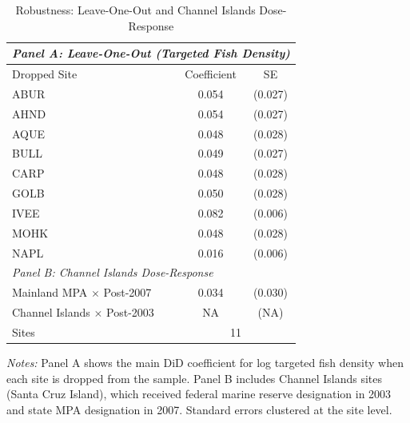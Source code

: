 \begin{table}[t]
\centering
\caption{Robustness: Leave-One-Out and Channel Islands Dose-Response}
\label{tab:robust}
\begin{threeparttable}
\begin{tabular}{lcc}
\toprule
\multicolumn{3}{l}{\textit{Panel A: Leave-One-Out (Targeted Fish Density)}} \\
\midrule
Dropped Site & Coefficient & SE \\
ABUR & 0.054 & (0.027) \\
AHND & 0.054 & (0.027) \\
AQUE & 0.048 & (0.028) \\
BULL & 0.049 & (0.027) \\
CARP & 0.048 & (0.028) \\
GOLB & 0.050 & (0.028) \\
IVEE & 0.082 & (0.006) \\
MOHK & 0.048 & (0.028) \\
NAPL & 0.016 & (0.006) \\
\midrule
\multicolumn{3}{l}{\textit{Panel B: Channel Islands Dose-Response}} \\
\midrule
Mainland MPA $\times$ Post-2007 & 0.034 & (0.030) \\
Channel Islands $\times$ Post-2003 & NA & (NA) \\
Sites & \multicolumn{2}{c}{11} \\
\bottomrule
\end{tabular}
\begin{tablenotes}[flushleft]
\footnotesize
\item \textit{Notes:} Panel A shows the main DiD coefficient for log targeted fish density when each site is dropped from the sample. Panel B includes Channel Islands sites (Santa Cruz Island), which received federal marine reserve designation in 2003 and state MPA designation in 2007. Standard errors clustered at the site level.
\end{tablenotes}
\end{threeparttable}
\end{table}
